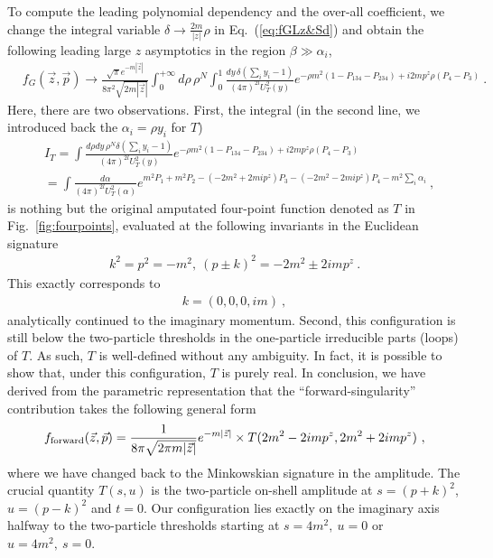 \documentclass[a4paper,11pt]{article}
\begin{document}
To compute the leading polynomial dependency and the over-all coefficient,  we change the integral variable $\delta \rightarrow\frac{2m}{|z|}\rho$ in Eq.~(\ref{eq:fGLz&Sd}) and obtain the following  leading large $z$ asymptotics in the region $\beta \gg \alpha_i$,
\begin{align}
&f_G(\vec{z},\vec{p})\rightarrow\frac{\sqrt{\pi}e^{-m|\vec{z}|}}{8\pi^2\sqrt{2m|\vec{z}|}}\int_{0}^{+\infty} d\rho \, \rho^N \int_{0}^{1}\frac{dy \, \delta\left(\sum_i y_i-1\right)}{(4\pi)^{2l}U_T^2(y)} e^{-\rho m^2(1-P_{134}-P_{234})+i2mp^z\rho (P_4-P_3)} \ . 
\end{align} 
Here, there are two observations. First,  the integral (in the second line, we introduced back the $\alpha_i=\rho y_i$ for $T$)
\begin{align}
&I_T=\int\frac{d\rho dy \, \rho^N\delta\left(\sum_i y_i-1\right)}{(4\pi)^{2l}U_T^2(y)} e^{-\rho m^2(1-P_{134}-P_{234})+i2mp^z\rho (P_4-P_3)} \nonumber \\ 
&=\int \frac{d\alpha}{(4\pi)^{2l}U_T^2(\alpha)}e^{m^2P_1+m^2P_2-(-2m^2+2mip^z)P_3-(-2m^2-2mip^z)P_4-m^2\sum_i\alpha_i} \ , 
\end{align}
is nothing but the original amputated four-point function denoted as $T$ in Fig.~\ref{fig:fourpoints}, evaluated at the following invariants in the Euclidean signature
\begin{align}
k^2=p^2=-m^2, \  (p\pm k)^2=-2m^2 \pm 2imp^z \ .
\end{align}
This exactly corresponds to
\begin{align}
k=(0,0,0,im) \ , 
\end{align}
analytically continued to the imaginary momentum. Second, this configuration is still below the two-particle thresholds in the one-particle irreducible parts (loops) of $T$. As such, $T$ is well-defined without any ambiguity.  In fact, it is possible to show that, under this configuration, $T$ is purely real. In conclusion, we have derived from the parametric representation that the ``forward-singularity'' contribution takes the following general form 
\begin{align}
f_{\rm forward}(\vec{z},\vec{p})=\frac{1}{8\pi\sqrt{2\pi m|\vec{z}|}}e^{-m|\vec{z}|} \times T(2m^2-2imp^z, 2m^2+2imp^z) \ , 
\end{align}
where we have changed back to the Minkowskian signature in the amplitude. The crucial quantity $T(s,u)$ is the two-particle on-shell amplitude at $s=(p+k)^2$, $u=(p-k)^2$ and $t=0$. Our configuration lies exactly on the imaginary axis halfway to the two-particle thresholds starting at $s=4m^2, \ u=0$ or $u=4m^2, \ s=0$.
\end{document}
